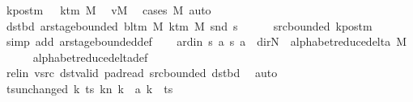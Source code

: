 \begin{isabellebody}
\ kpos{\isacharunderscore}{\kern0pt}tm{\isacharcolon}{\kern0pt}\ {\isachardoublequoteopen}{}\ {\isacharless}{\kern0pt}\ k{\isacharunderscore}{\kern0pt}tm\ M{\isachardoublequoteclose}\ \isamarkupfalse%
\ vM\ \isamarkupfalse%
\ {\isacharparenleft}{\kern0pt}cases\ M{\isacharparenright}{\kern0pt}\ auto\isanewline
\ \ \isamarkupfalse%
\ dst{\isacharunderscore}{\kern0pt}bd{\isacharcolon}{\kern0pt}\ {\isachardoublequoteopen}ar{\isacharunderscore}{\kern0pt}stage{\isacharunderscore}{\kern0pt}bounded\ {\isacharparenleft}{\kern0pt}bl{\isacharunderscore}{\kern0pt}tm\ M{\isacharparenright}{\kern0pt}\ {\isacharparenleft}{\kern0pt}k{\isacharunderscore}{\kern0pt}tm\ M{\isacharparenright}{\kern0pt}\ {\isacharparenleft}{\kern0pt}snd\ {\isacharquery}{\kern0pt}s{\isacharprime}{\kern0pt}{\isacharparenright}{\kern0pt}{\isachardoublequoteclose}\isanewline
\ \ \ \ \isamarkupfalse%
\ src{\isacharunderscore}{\kern0pt}bounded\ kpos{\isacharunderscore}{\kern0pt}tm\ \isamarkupfalse%
\ {\isacharparenleft}{\kern0pt}simp\ add{\isacharcolon}{\kern0pt}\ ar{\isacharunderscore}{\kern0pt}stage{\isacharunderscore}{\kern0pt}bounded{\isacharunderscore}{\kern0pt}def{\isacharparenright}{\kern0pt}\isanewline
\ \ \isamarkupfalse%
\ ard{\isacharunderscore}{\kern0pt}in{\isacharcolon}{\kern0pt}\ {\isachardoublequoteopen}{\isacharparenleft}{\kern0pt}{\isacharquery}{\kern0pt}s{\isacharcomma}{\kern0pt}\ {\isacharquery}{\kern0pt}a{\isacharcomma}{\kern0pt}\ {\isacharquery}{\kern0pt}s{\isacharprime}{\kern0pt}{\isacharcomma}{\kern0pt}\ {\isacharquery}{\kern0pt}a{\isacharcomma}{\kern0pt}\ {\isacharparenleft}{\kern0pt}{\isasymlambda}{\isacharunderscore}{\kern0pt}{\isachardot}{\kern0pt}\ dir{\isachardot}{\kern0pt}N{\isacharparenright}{\kern0pt}{\isacharparenright}{\kern0pt}\ {\isasymin}\ alphabet{\isacharunderscore}{\kern0pt}reduce{\isacharunderscore}{\kern0pt}delta\ M{\isachardoublequoteclose}\isanewline
\ \ \ \ \isamarkupfalse%
\ alphabet{\isacharunderscore}{\kern0pt}reduce{\isacharunderscore}{\kern0pt}delta{\isacharunderscore}{\kern0pt}def\isanewline
\ \ \ \ \isamarkupfalse%
\ rel{\isacharunderscore}{\kern0pt}in\ vsrc\ dst{\isacharunderscore}{\kern0pt}valid\ pad{\isacharunderscore}{\kern0pt}read\ src{\isacharunderscore}{\kern0pt}bounded\ dst{\isacharunderscore}{\kern0pt}bd\ \isamarkupfalse%
\ auto\isanewline
\ \ \isamarkupfalse%
\ ts{\isacharunderscore}{\kern0pt}unchanged{\isacharcolon}{\kern0pt}\ {\isachardoublequoteopen}{\isacharparenleft}{\kern0pt}{\isasymlambda}k{\isachardot}{\kern0pt}\ {\isacharparenleft}{\kern0pt}ts\ k{\isacharparenright}{\kern0pt}{\isacharparenleft}{\kern0pt}n\ k\ {\isacharcolon}{\kern0pt}{\isacharequal}{\kern0pt}\ {\isacharquery}{\kern0pt}a\ k{\isacharparenright}{\kern0pt}{\isacharparenright}{\kern0pt}\ {\isacharequal}{\kern0pt}\ ts{\isachardoublequoteclose}\ \isamarkupfalse%

\end{isabellebody}
